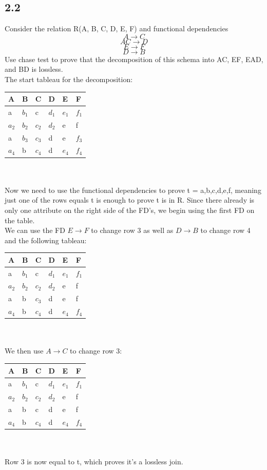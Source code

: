 \documentclass[12pt]{article}
\begin{document}
\subsection*{2.2}
Consider the relation R(A, B, C, D, E, F) and functional dependencies
$$A\rightarrow C$$
$$AC\rightarrow D$$
$$E\rightarrow F$$
$$D\rightarrow B$$
Use chase test to prove that the decomposition of this schema into AC, EF, EAD, and BD is lossless.\\

The start tableau for the decomposition:\\

\begin{tabular}{llllll}
A & B & C & D & E & F  \\
\hline
a     & $b_1$ & c     & $d_1$ & $e_1$ & $f_1$ \\
$a_2$ & $b_2$ & $c_2$ & $d_2$ & e     & f \\
a     & $b_3$ & $c_3$ & d     & e     & $f_3$ \\
$a_4$ & b     & $c_4$ & d     & $e_4$ & $f_4$
\end{tabular}
\\\\
Now we need to use the functional dependencies to prove t = {a,b,c,d,e,f}, meaning just one of the rows equals t is enough to prove t is in R. Since there already is only one attribute on the right side of the FD's, we begin using the first FD on the table.\\
We can use the FD $E\rightarrow F$ to change row 3 as well as $D\rightarrow B$ to change row 4 and the following tableau:\\

\begin{tabular}{llllll}
A & B & C & D & E & F  \\
\hline
a     & $b_1$ & c     & $d_1$ & $e_1$ & $f_1$ \\
$a_2$ & $b_2$ & $c_2$ & $d_2$ & e     & f \\
a     & b     & $c_3$ & d     & e     & f \\
$a_4$ & b     & $c_4$ & d     & $e_4$ & $f_4$
\end{tabular}
\\\\
We then use $A\rightarrow C$ to change row 3:\\

\begin{tabular}{llllll}
A & B & C & D & E & F  \\
\hline
a     & $b_1$ & c     & $d_1$ & $e_1$ & $f_1$ \\
$a_2$ & $b_2$ & $c_2$ & $d_2$ & e     & f \\
a     & b     & c     & d     & e     & f \\
$a_4$ & b     & $c_4$ & d     & $e_4$ & $f_4$
\end{tabular}
\\\\
Row 3 is now equal to t, which proves it's a lossless join.
\end{document}

